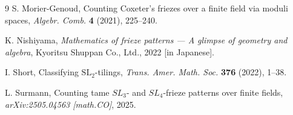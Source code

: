 \documentclass[11pt]{amsart}
\theoremstyle{plain}
\theoremstyle{definition}
\theoremstyle{remark}
\begin{document}
\begin{thebibliography}{9}
S. Morier-Genoud,
Counting Coxeter’s friezes over a ﬁnite ﬁeld via moduli spaces,
\emph{Algebr. Comb.} \textbf{4} (2021), 225--240.

K. Nishiyama, \textit{Mathematics of frieze patterns --- A glimpse of geometry
and algebra}, Kyoritsu Shuppan Co., Ltd., 2022 [in Japanese].

I. Short, Classifying $\mathrm{SL}_2$-tilings, \emph{Trans. Amer. Math. Soc.}
\textbf{376} (2022), 1--38.

L. Surmann,
Counting tame $SL_3$- and $SL_4$-frieze patterns over finite fields,
\textit{arXiv:2505.04563 [math.CO]}, 2025.


\end{thebibliography}
\end{document}
